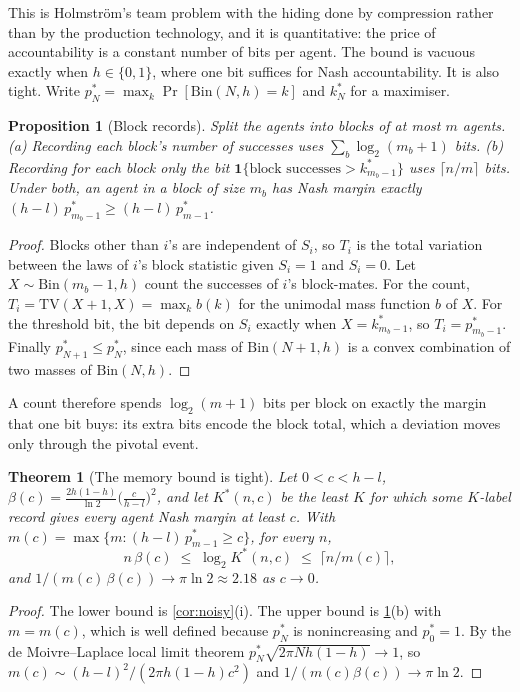 \documentclass[sigconf,anonymous,acmthm=false]{aamas}
\theoremstyle{acmplain}
\newtheorem{theorem}{Theorem}
\newtheorem{proposition}{Proposition}
\theoremstyle{acmdefinition}
\newcommand{\TV}{\mathrm{TV}}
\begin{document}
This is Holmstr\"om's team problem with the hiding done by compression rather than by the
production technology, and it is quantitative: the price of accountability is a constant
number of bits per agent. The bound is vacuous exactly when $h\in\{0,1\}$, where one bit
suffices for Nash accountability. It is also tight. Write
$p^*_N=\max_k\Pr[\mathrm{Bin}(N,h)=k]$ and $k^*_N$ for a maximiser.

\begin{proposition}[Block records]\label{prop:blocks}
Split the agents into blocks of at most $m$ agents. (a) Recording each block's number of
successes uses $\sum_b\log_2(m_b+1)$ bits. (b) Recording for each block only the bit
$\mathbf1\{\text{block successes}>k^*_{m_b-1}\}$ uses $\lceil n/m\rceil$ bits. Under both, an
agent in a block of size $m_b$ has Nash margin exactly $(h-l)\,p^*_{m_b-1}\ge(h-l)\,p^*_{m-1}$.
\end{proposition}
\begin{proof}
Blocks other than $i$'s are independent of $S_i$, so $T_i$ is the total variation between the
laws of $i$'s block statistic given $S_i=1$ and $S_i=0$. Let $X\sim\mathrm{Bin}(m_b-1,h)$
count the successes of $i$'s block-mates. For the count, $T_i=\TV(X+1,X)=\max_kb(k)$ for the
unimodal mass function $b$ of $X$. For the threshold bit, the bit depends on $S_i$ exactly
when $X=k^*_{m_b-1}$, so $T_i=p^*_{m_b-1}$. Finally $p^*_{N+1}\le p^*_N$, since each mass of
$\mathrm{Bin}(N+1,h)$ is a convex combination of two masses of $\mathrm{Bin}(N,h)$.
\end{proof}

A count therefore spends $\log_2(m+1)$ bits per block on exactly the margin that one bit buys:
its extra bits encode the block total, which a deviation moves only through the pivotal event.

\begin{theorem}[The memory bound is tight]\label{thm:tight}
Let $0<c<h-l$, $\beta(c)=\frac{2h(1-h)}{\ln2}\big(\frac c{h-l}\big)^2$, and let $K^*(n,c)$ be
the least $K$ for which some $K$-label record gives every agent Nash margin at least $c$.
With $m(c)=\max\{m:(h-l)\,p^*_{m-1}\ge c\}$, for every $n$,
\[ n\,\beta(c)\;\le\;\log_2K^*(n,c)\;\le\;\lceil n/m(c)\rceil, \]
and $1/(m(c)\,\beta(c))\to\pi\ln2\approx2.18$ as $c\to0$.
\end{theorem}
\begin{proof}
The lower bound is \cref{cor:noisy}(i). The upper bound is \cref{prop:blocks}(b) with
$m=m(c)$, which is well defined because $p^*_N$ is nonincreasing and $p^*_0=1$. By the de
Moivre--Laplace local limit theorem $p^*_N\sqrt{2\pi Nh(1-h)}\to1$, so
$m(c)\sim(h-l)^2/(2\pi h(1-h)c^2)$ and $1/(m(c)\beta(c))\to\pi\ln2$.
\end{proof}
\end{document}
